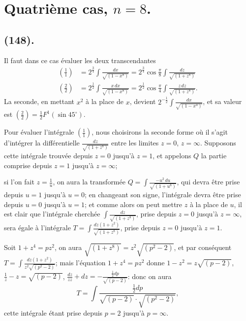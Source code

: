 \documentclass{article}
\begin{document}
\section*{Quatrième cas, $n=8$.}

\subsection*{(148).}

Il faut dans ce cas évaluer les deux transcendantes
\[ \begin{aligned} \left(\frac{1}{1}\right)&=2^{\frac{3}{4}}\int\frac{dx}{\sqrt{(1-x^{8})}}=2^{\frac{3}{4}}\cos\frac{\pi}{8}\int\frac{dz}{\sqrt{(1+z^{8})}}\\ \left(\frac{2}{2}\right)&=2^{\frac{1}{2}}\int\frac{x\,dx}{\sqrt{(1-x^{8})}}=2^{\frac{1}{2}}\cos\frac{\pi}{4}\int\frac{z\,dz}{\sqrt{(1+z^{8})}}. \end{aligned} \]
La seconde, en mettant $x^{2}$ à la place de $x$, devient $2^{-\frac{1}{2}}\displaystyle\int\frac{dx}{\sqrt{(1-x^{4})}}$, et sa valeur est $\left(\frac{2}{2}\right)=\frac{1}{2}F^{1}(\sin 45^{\circ})$.

Pour évaluer l'intégrale $\left(\frac{1}{1}\right)$, nous choisirons la seconde forme où il s'agit d'intégrer la différentielle $\frac{dz}{\sqrt{(1+z^{8})}}$ entre les limites $z=0$, $z=\infty$. Supposons cette intégrale trouvée depuis $z=0$ jusqu'à $z=1$, et appelons $Q$ la partie comprise depuis $z=1$ jusqu'à $z=\infty$;

si l'on fait $z=\frac{1}{u}$, on aura la transformée $Q=\displaystyle\int\frac{-u^{2}\,du}{\sqrt{(1+u^{8})}}$, qui devra être prise depuis $u=1$ jusqu'à $u=0$; en changeant son signe, l'intégrale devra être prise depuis $u=0$ jusqu'à $u=1$; et comme alors on peut mettre $z$ à la place de $u$, il est clair que l'intégrale cherchée $\displaystyle\int\frac{dz}{\sqrt{(1+z^{8})}}$, prise depuis $z=0$ jusqu'à $z=\infty$, sera égale à l'intégrale $T=\displaystyle\int\frac{dz(1+z^{2})}{\sqrt{(1+z^{8})}}$, prise depuis $z=0$ jusqu'à $z=1$.

Soit $1+z^{4}=pz^{2}$, on aura $\sqrt{(1+z^{8})}=z^{2}\sqrt{(p^{2}-2)}$, et par conséquent $T=\displaystyle\int\frac{dz(1+z^{2})}{z^{2}\sqrt{(p^{2}-2)}}$; mais l'équation $1+z^{4}=pz^{2}$ donne $1-z^{2}=z\sqrt{(p-2)}$, $\frac{1}{z}-z=\sqrt{(p-2)}$, $\frac{dz}{zz}+dz=-\frac{\frac{1}{2}dp}{\sqrt{(p-2)}}$: donc on aura
\[ T=\int\frac{\tfrac{1}{2}dp}{\sqrt{(p-2)}\cdot\sqrt{(p^{2}-2)}}, \]
cette intégrale étant prise depuis $p=2$ jusqu'à $p=\infty$.
\end{document}
